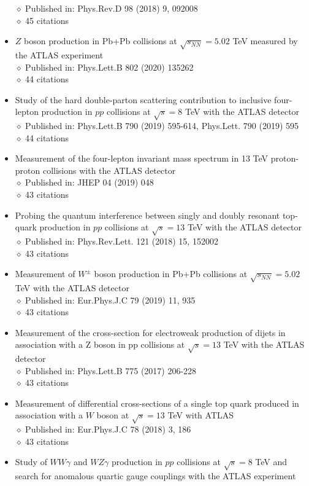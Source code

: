 \documentclass[margin, 10pt]{res} %
\begin{document}
\begin{resume}
\begin{itemize}
$\diamond$ Published in: Phys.Rev.D 98 (2018) 9, 092008\\
$\diamond$ 45 citations
\item $Z$ boson production in Pb+Pb collisions at $\sqrt{s_{NN}} = 5.02$ TeV measured by the ATLAS experiment\\
$\diamond$ Published in: Phys.Lett.B 802 (2020) 135262\\
$\diamond$ 44 citations
\item Study of the hard double-parton scattering contribution to inclusive four-lepton production in $pp$ collisions at $\sqrt{s} = 8$ TeV with the ATLAS detector\\
$\diamond$ Published in: Phys.Lett.B 790 (2019) 595-614, Phys.Lett. 790 (2019) 595\\
$\diamond$ 44 citations
\item Measurement of the four-lepton invariant mass spectrum in 13 TeV proton-proton collisions with the ATLAS detector\\
$\diamond$ Published in: JHEP 04 (2019) 048\\
$\diamond$ 43 citations
\item Probing the quantum interference between singly and doubly resonant top-quark production in $pp$ collisions at $\sqrt{s} = 13$ TeV with the ATLAS detector\\
$\diamond$ Published in: Phys.Rev.Lett. 121 (2018) 15, 152002\\
$\diamond$ 43 citations
\item Measurement of $W^{\pm}$ boson production in Pb+Pb collisions at $\sqrt{s_{NN}} = 5.02$ TeV with the ATLAS detector\\
$\diamond$ Published in: Eur.Phys.J.C 79 (2019) 11, 935\\
$\diamond$ 43 citations
\item Measurement of the cross-section for electroweak production of dijets in association with a Z boson in pp collisions at $\sqrt{s} = 13$ TeV with the ATLAS detector\\
$\diamond$ Published in: Phys.Lett.B 775 (2017) 206-228\\
$\diamond$ 43 citations
\item Measurement of differential cross-sections of a single top quark produced in association with a $W$ boson at $\sqrt{s} = 13$ TeV with ATLAS\\
$\diamond$ Published in: Eur.Phys.J.C 78 (2018) 3, 186\\
$\diamond$ 43 citations
\item Study of $WW\gamma$ and $WZ\gamma$ production in $pp$ collisions at $\sqrt{s} = 8$ TeV and search for anomalous quartic gauge couplings with the ATLAS experiment\\

\end{itemize}
\end{resume}
\end{document}
